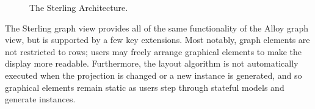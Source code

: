\documentclass[runningheads]{llncs}
\begin{document}
\begin{figure}
\caption{The Sterling Architecture.}
\label{fig:sterling}
\end{figure}


The Sterling graph view provides all of the same functionality of the Alloy graph view, but is supported by a few key extensions. 
Most notably, graph elements are not restricted to rows; users may freely arrange graphical elements to make the display more readable. 
Furthermore, the layout algorithm is not automatically executed when the projection is changed or a new instance is generated, and so graphical elements remain static as users step through stateful models and generate instances.
\end{document}
